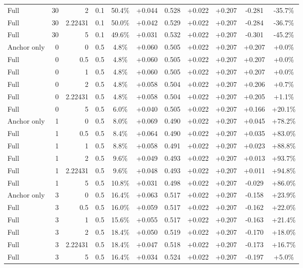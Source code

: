 \begin{table}[htbp]
\begin{tabular}{lrrrccccccc}
Full & 30 & 2 & 0.1 & 50.4\% & +0.044 & 0.528 & +0.022 & +0.207 & -0.281 & -35.7\% \\
Full & 30 & 2.22431 & 0.1 & 50.0\% & +0.042 & 0.529 & +0.022 & +0.207 & -0.284 & -36.7\% \\
Full & 30 & 5 & 0.1 & 49.6\% & +0.031 & 0.532 & +0.022 & +0.207 & -0.301 & -45.2\% \\
Anchor only & 0 & 0 & 0.5 & 4.8\% & +0.060 & 0.505 & +0.022 & +0.207 & +0.207 & +0.0\% \\
Full & 0 & 0.5 & 0.5 & 4.8\% & +0.060 & 0.505 & +0.022 & +0.207 & +0.207 & +0.0\% \\
Full & 0 & 1 & 0.5 & 4.8\% & +0.060 & 0.505 & +0.022 & +0.207 & +0.207 & +0.0\% \\
Full & 0 & 2 & 0.5 & 4.8\% & +0.058 & 0.504 & +0.022 & +0.207 & +0.206 & +0.7\% \\
Full & 0 & 2.22431 & 0.5 & 4.8\% & +0.058 & 0.504 & +0.022 & +0.207 & +0.205 & +1.1\% \\
Full & 0 & 5 & 0.5 & 6.0\% & +0.040 & 0.505 & +0.022 & +0.207 & +0.166 & +20.1\% \\
Anchor only & 1 & 0 & 0.5 & 8.0\% & +0.069 & 0.490 & +0.022 & +0.207 & +0.045 & +78.2\% \\
Full & 1 & 0.5 & 0.5 & 8.4\% & +0.064 & 0.490 & +0.022 & +0.207 & +0.035 & +83.0\% \\
Full & 1 & 1 & 0.5 & 8.8\% & +0.058 & 0.491 & +0.022 & +0.207 & +0.023 & +88.8\% \\
Full & 1 & 2 & 0.5 & 9.6\% & +0.049 & 0.493 & +0.022 & +0.207 & +0.013 & +93.7\% \\
Full & 1 & 2.22431 & 0.5 & 9.6\% & +0.048 & 0.493 & +0.022 & +0.207 & +0.011 & +94.8\% \\
Full & 1 & 5 & 0.5 & 10.8\% & +0.031 & 0.498 & +0.022 & +0.207 & -0.029 & +86.0\% \\
Anchor only & 3 & 0 & 0.5 & 16.4\% & +0.063 & 0.517 & +0.022 & +0.207 & -0.158 & +23.9\% \\
Full & 3 & 0.5 & 0.5 & 16.0\% & +0.059 & 0.517 & +0.022 & +0.207 & -0.162 & +22.0\% \\
Full & 3 & 1 & 0.5 & 15.6\% & +0.055 & 0.517 & +0.022 & +0.207 & -0.163 & +21.4\% \\
Full & 3 & 2 & 0.5 & 18.4\% & +0.050 & 0.519 & +0.022 & +0.207 & -0.170 & +18.0\% \\
Full & 3 & 2.22431 & 0.5 & 18.4\% & +0.047 & 0.518 & +0.022 & +0.207 & -0.173 & +16.7\% \\
Full & 3 & 5 & 0.5 & 16.4\% & +0.034 & 0.524 & +0.022 & +0.207 & -0.197 & +5.0\% \\

\end{tabular}
\end{table}
